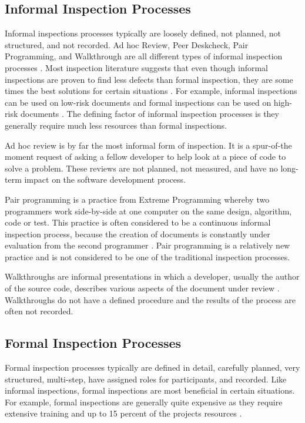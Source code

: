 \subsection{Informal Inspection Processes}
Informal inspections processes typically are loosely defined, not planned,
not structured, and not recorded. Ad hoc Review, Peer Deskcheck, Pair
Programming, and Walkthrough are all different types of informal inspection
processes \cite{Wiegers02}. Most inspection literature suggests that even
though informal inspections are proven to find less defects than formal
inspection, they are some times the best solutions for certain situations
\cite{Gilb93, Wiegers02}. For example, informal inspections can be used on
low-risk documents and formal inspections can be used on high-risk
documents \cite{Wiegers02}. The defining factor of informal inspection
processes is they generally require much less resources than formal
inspections.

Ad hoc review is by far the most informal form of inspection. It is a
spur-of-the moment request of asking a fellow developer to help look at a
piece of code to solve a problem. These reviews are not planned, not
measured, and have no long-term impact on the software development process.

Pair programming is a practice from Extreme Programming whereby two
programmers work side-by-side at one computer on the same design,
algorithm, code or test. This practice is often considered to be a
continuous informal inspection process, because the creation of documents is 
constantly under evaluation from the second programmer
\cite{Wiegers02}. Pair programming is a relatively new practice and is not
considered to be one of the traditional inspection processes.

Walkthroughs are informal presentations in which a developer, usually the
author of the source code, describes various aspects of the document under
review \cite{Wiegers02, Freedman90}. Walkthroughs do not have a defined
procedure and the results of the process are often not recorded. 


\subsection{Formal Inspection Processes}
Formal inspection processes typically are defined in detail, carefully
planned, very structured, multi-step, have assigned roles for participants,
and recorded. Like informal inspections, formal inspections are most
beneficial in certain situations. For example, formal inspections are
generally quite expensive as they require extensive training and up to 15
percent of the projects resources \cite{Gilb93}.

